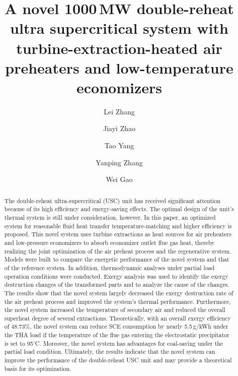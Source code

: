 \documentclass[preprint,12pt]{elsarticle}
\begin{document}
\begin{frontmatter}



\title{A novel 1000\,MW double-reheat ultra supercritical system with turbine-extraction-heated air preheaters and low-temperature economizers}


\author[hust,ncst]{Lei Zhang}
\author[hust]{Jiayi Zhao}
\author[hust]{Tao Yang} %
\author[hust]{Yanping Zhang}
\author[hust]{Wei Gao}


\address[hust]{School of Energy and Power Engineering, Huazhong University of Science and Technology, Wuhan 430074, China}
\address[ncst]{College of Metallurgy and Energy, North China University of Science and Technology, Tangshan 063009, China}

\begin{abstract}%
The double-reheat ultra-supercritical (USC) unit has received significant attention because of its high efficiency and energy-saving effects.
The optimal design of the unit's thermal system is still under consideration, however.
In this paper, an optimized system for reasonable fluid heat transfer temperature-matching and higher efficiency is proposed.
This novel system uses turbine extractions as heat sources for air preheaters and low-pressure economizers to absorb economizer outlet flue gas heat, thereby realizing the joint optimization of the air preheat process and the regenerative system.
Models were built to compare the energetic performance of the novel system and that of the reference system.
In addition, thermodynamic analyses under partial load operation conditions were conducted. 
Exergy analysis was used to identify the exergy destruction changes of the transformed parts and to analyze the cause of the changes.
The results show that the novel system largely decreased the exergy destruction rate of the air preheat process and improved the system's thermal performance.
Furthermore, the novel system increased the temperature of secondary air and reduced the overall superheat degree of several extractions.
Theoretically, with an overall exergy efficiency of 48.73\%, the novel system can reduce SCE
consumption by nearly 5.5\,g/kWh under the THA load
if the temperature of the flue gas entering the electrostatic precipitator is set to 95$^\circ$C.
Moreover, the novel system has advantages for coal-saving under the partial load condition.
Ultimately, the results indicate that the novel system can improve the performance of the double-reheat USC unit and may provide a theoretical basis for its optimization.


\end{abstract}
\end{frontmatter}
\end{document}
